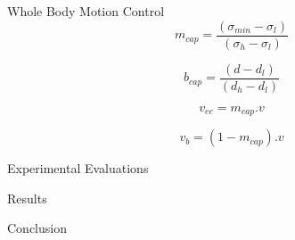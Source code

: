 \documentclass{beamer}
\begin{document}
	\begin{frame}{Whole Body Motion Control}
		\begin{equation}
		m_{cap} = \frac{(\sigma_{min} - \sigma_{l})}{(\sigma_{h} - \sigma_{l})}
		\end{equation}

		\begin{equation}
		b_{cap} = \frac{(d - d_{l})}{(d_{h} - d_{l})}
		\end{equation}
		
		\begin{equation}
		v_{ee} = m_{cap}.v
		\end{equation} 
		
		\begin{equation}
		v_{b} = (1 - m_{cap}).v
		\end{equation} 

	\end{frame}
	
	\begin{frame}{Experimental Evaluations}
		
	\end{frame}
	
	\begin{frame}{Results}
	
	\end{frame}
	
	\begin{frame}{Conclusion}
	
	\end{frame}
\end{document}
